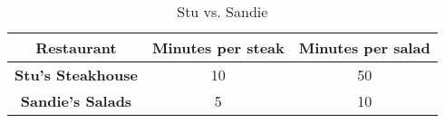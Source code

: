\begin{table}
  \begin{tabular}{|c|c|c|}
    \hline
    \textbf{Restaurant} & \textbf{Minutes per steak} & \textbf{Minutes per salad} \\
    \hline
    \textbf{Stu's Steakhouse} & 10 & 50 \\
    \hline
    \textbf{Sandie's Salads} & 5 & 10 \\
    \hline
  \end{tabular}
  \caption{Stu vs. Sandie}
\end{table}